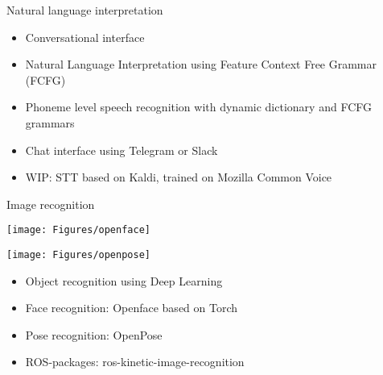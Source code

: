\documentclass[12pt,a4paper]{article}
\newcommand{\emptylogo}{\texttt{[image: Figures/Empty]}}
\begin{document}
\begin{slidetop}
\begin{multicols}{2}
\vspace{-0.83cm} %

\begin{bclogo}[couleur = white, arrondi = 0.25, couleurBord = tuedarkblue, barre = none, logo=\emptylogo]{\textcolor{tuedarkblue}{Natural language interpretation}}
\medskip %
\begin{itemize}[itemsep = 0pt, parsep = 0pt, leftmargin=15pt]
	\item Conversational interface
	\item Natural Language Interpretation using Feature Context Free Grammar (FCFG)
	\item Phoneme level speech recognition with dynamic dictionary and FCFG grammars
	\item Chat interface using Telegram or Slack
	\item WIP: STT based on Kaldi, trained on Mozilla Common Voice
\end{itemize}
\end{bclogo}

\vspace{-0.8cm} %

\begin{bclogo}[couleur = white, arrondi = 0.25, couleurBord = tuedarkblue , barre = none, logo=\emptylogo]{\textcolor{tuedarkblue}{Image recognition}}
\medskip %
\begin{minipage}[T]{0.48\linewidth}
	\begin{center}
		\texttt{[image: Figures/openface]}
	\end{center}
\end{minipage}
\hfill
\begin{minipage}[T]{0.48\linewidth}
    \begin{center}
        \texttt{[image: Figures/openpose]}
    \end{center}
\end{minipage}
\begin{itemize}[itemsep = 0pt, parsep = 0pt, leftmargin=15pt]
	\item Object recognition using Deep Learning
	\item Face recognition: Openface based on Torch
    \item Pose recognition: OpenPose
    \item ROS-packages: ros-kinetic-image-recognition
\end{itemize}
\end{bclogo}


\end{multicols}
\end{slidetop}
\end{document}
